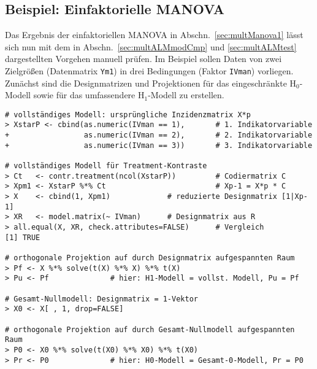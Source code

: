 \subsection{Beispiel: Einfaktorielle MANOVA}
\label{sec:multALMexMan1}

Das Ergebnis der einfaktoriellen MANOVA in Abschn.\ \ref{sec:multManova1} lässt sich nun mit dem in Abschn.\ \ref{sec:multALMmodCmp} und \ref{sec:multALMtest} dargestellten Vorgehen manuell prüfen. Im Beispiel sollen Daten von zwei Zielgrößen (Datenmatrix \lstinline!Ym1!) in drei Bedingungen (Faktor \lstinline!IVman!) vorliegen. Zunächst sind die Designmatrizen und Projektionen für das eingeschränkte $\text{H}_{0}$-Modell sowie für das umfassendere $\text{H}_{1}$-Modell zu erstellen.
\begin{lstlisting}
# vollständiges Modell: ursprüngliche Inzidenzmatrix X*p
> XstarP <- cbind(as.numeric(IVman == 1),       # 1. Indikatorvariable
+                 as.numeric(IVman == 2),       # 2. Indikatorvariable
+                 as.numeric(IVman == 3))       # 3. Indikatorvariable

# vollständiges Modell für Treatment-Kontraste
> Ct   <- contr.treatment(ncol(XstarP))         # Codiermatrix C
> Xpm1 <- XstarP %*% Ct                         # Xp-1 = X*p * C
> X    <- cbind(1, Xpm1)             # reduzierte Designmatrix [1|Xp-1]
> XR   <- model.matrix(~ IVman)      # Designmatrix aus R
> all.equal(X, XR, check.attributes=FALSE)      # Vergleich
[1] TRUE

# orthogonale Projektion auf durch Designmatrix aufgespannten Raum
> Pf <- X %*% solve(t(X) %*% X) %*% t(X)
> Pu <- Pf              # hier: H1-Modell = vollst. Modell, Pu = Pf

# Gesamt-Nullmodell: Designmatrix = 1-Vektor
> X0 <- X[ , 1, drop=FALSE]

# orthogonale Projektion auf durch Gesamt-Nullmodell aufgespannten Raum
> P0 <- X0 %*% solve(t(X0) %*% X0) %*% t(X0)
> Pr <- P0              # hier: H0-Modell = Gesamt-0-Modell, Pr = P0
\end{lstlisting}

